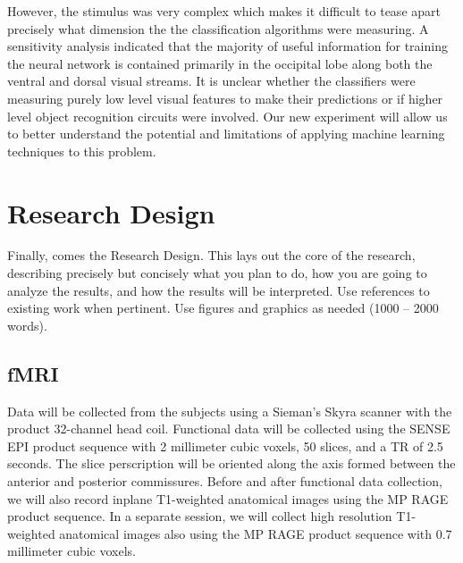\documentclass[12pt]{article}
\begin{document}
However, the stimulus was very complex which makes it difficult to tease apart precisely what dimension the the classification algorithms were measuring.
A sensitivity analysis indicated that the majority of useful information for training the neural network is contained primarily in the occipital lobe along both the ventral and dorsal visual streams.
It is unclear whether the classifiers were measuring purely low level visual features to make their predictions or if higher level object recognition circuits were involved.
Our new experiment will allow us to better understand the potential and limitations of applying machine learning techniques to this problem.

\section{Research Design}
Finally, comes the Research Design. 
This lays out the core of the research, describing precisely but concisely what you plan to do, how you are going to analyze the results, and how the results will be interpreted. 
Use references to existing work when pertinent. 
Use figures and graphics as needed (1000 – 2000 words).

\subsection{fMRI}
Data will be collected from the subjects using a Sieman's Skyra scanner with the product 32-channel head coil.
Functional data will be collected using the SENSE EPI product sequence with 2 millimeter cubic voxels, 50 slices, and a TR of 2.5 seconds.
The slice perscription will be oriented along the axis formed between the anterior and posterior commissures.
Before and after functional data collection, we will also record inplane T1-weighted anatomical images using the MP RAGE product sequence.
In a separate session, we will collect high resolution T1-weighted anatomical images also using the MP RAGE product sequence with 0.7 millimeter cubic voxels.
\end{document}

